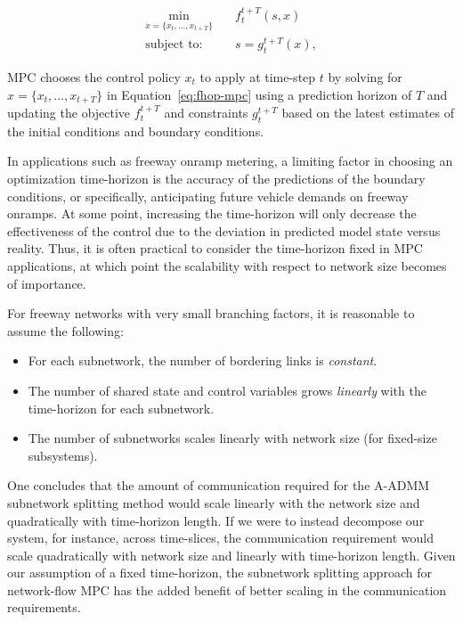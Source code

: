 \begin{align}
  \label{eq:fhop-mpc}
  \min_{x = \{x_t,\ldots, x_{t + T}\}} & \quad f_t^{t + T}\left(s, x\right) \\
  \text{subject to:} & \quad s = g_t^{t + T}\left(x\right) \nonumber,
\end{align}

MPC chooses the control policy $x_t$ to apply at time-step $t$ by solving for $x = \{x_t,\ldots, x_{t + T}\}$ in Equation~\eqref{eq:fhop-mpc} using a prediction horizon of $T$ and updating the objective $f_t^{t+T}$ and constraints $g_{t}^{t + T}$ based on the latest estimates of the initial conditions and boundary conditions.

In applications such as freeway onramp metering, a limiting factor in choosing an optimization time-horizon is the accuracy of the predictions of the boundary conditions, or specifically, anticipating future vehicle demands on freeway onramps. At some point, increasing the time-horizon will only decrease the effectiveness of the control due to the deviation in predicted model state versus reality. Thus, it is often practical to consider the time-horizon fixed in MPC applications, at which point the scalability with respect to network size becomes of importance.

For freeway networks with very small branching factors, it is reasonable to assume the following:

\begin{itemize}
  \item For each subnetwork, the number of bordering links is \emph{constant}.
  \item The number of shared state and control variables grows \emph{linearly} with the time-horizon for each subnetwork.
  \item The number of subnetworks scales linearly with network size (for fixed-size subsystems).
\end{itemize}

 One concludes that the amount of communication required for the A-ADMM subnetwork splitting method would scale linearly with the network size and quadratically with time-horizon length. If we were to instead decompose our system, for instance, across time-slices, the communication requirement would scale quadratically with network size and linearly with time-horizon length. Given our assumption of a fixed time-horizon, the subnetwork splitting approach for network-flow MPC has the added benefit of better scaling in the communication requirements.

